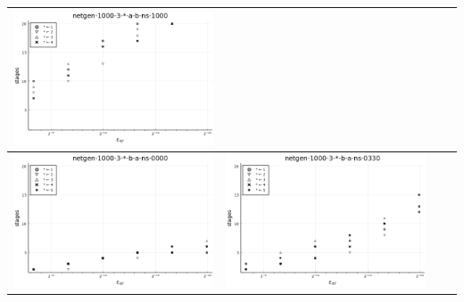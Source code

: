 \documentclass{article}
\begin{document}
\begin{landscape}
\begin{center}
\begin{longtable}{| c | c | c | c |}
\includegraphics[height=0.22\textheight]{hiter_fixlim_netgen-1000-3-_-a-b-ns-1000.png} \\
                \hline
\includegraphics[height=0.22\textheight]{hiter_fixlim_netgen-1000-3-_-b-a-ns-0000.png} &
\includegraphics[height=0.22\textheight]{hiter_fixlim_netgen-1000-3-_-b-a-ns-0330.png} &

\end{longtable}
\end{center}
\end{landscape}
\end{document}
